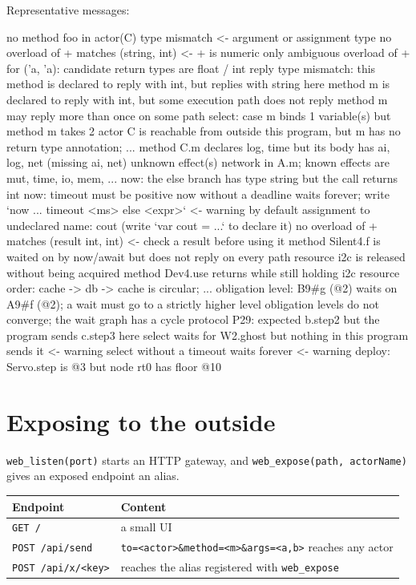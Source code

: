 \documentclass[11pt,a4paper]{article}
\begin{document}
Representative messages:

\begin{term}
no method foo in actor(C)
type mismatch                                  <- argument or assignment type
no overload of + matches (string, int)         <- + is numeric only
ambiguous overload of + for ('a, 'a): candidate return types are float / int
reply type mismatch: this method is declared to reply with int,
  but replies with string here
method m is declared to reply with int, but some execution path does not reply
method m may reply more than once on some path
select: case m binds 1 variable(s) but method m takes 2
actor C is reachable from outside this program, but m has no return type
  annotation; ...
method C.m declares {log, time} but its body has {ai, log, net}
  (missing {ai, net})
unknown effect(s) network in A.m; known effects are mut, time, io, mem, ...
now: the else branch has type string but the call returns int
now: timeout must be positive
now without a deadline waits forever;
  write `now ... timeout <ms> else <expr>`      <- warning by default
assignment to undeclared name: cout (write `var cout = ...` to declare it)
no overload of + matches (result int, int)     <- check a result before using it
method Silent4.f is waited on by now/await but does not reply on every path
resource i2c is released without being acquired
method Dev4.use returns while still holding i2c
resource order: cache -> db -> cache is circular; ...
obligation level: B9#g (@2) waits on A9#f (@2);
  a wait must go to a strictly higher level
obligation levels do not converge; the wait graph has a cycle
protocol P29: expected b.step2 but the program sends c.step3 here
select waits for W2.ghost but nothing in this program sends it   <- warning
select without a timeout waits forever                            <- warning
deploy: Servo.step is @3 but node rt0 has floor @10
\end{term}

\section{Exposing to the outside}
\label{sec:expose}

\texttt{web\_listen(port)} starts an HTTP gateway, and
\texttt{web\_expose(path, actorName)} gives an exposed endpoint an alias.

\begin{center}
\begin{tabular}{@{}ll@{}}
\toprule
Endpoint & Content \\
\midrule
\texttt{GET /}                & a small UI \\
\texttt{POST /api/send}       & \texttt{to=<actor>\&method=<m>\&args=<a,b>} reaches any actor \\
\texttt{POST /api/x/<key>}    & reaches the alias registered with \texttt{web\_expose} \\
\bottomrule
\end{tabular}
\end{center}
\end{document}
